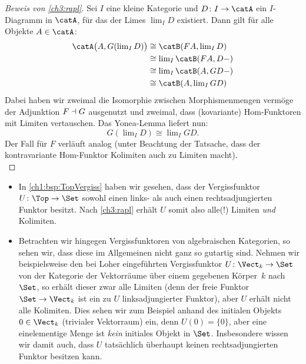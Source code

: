 \begin{proof}[Beweis von \cref{ch3:rapl}]
    Sei $I$ eine kleine Kategorie und $D\colon I\to\catA$ ein $I$-Diagramm
    in $\catA$, für das der Limes $\lim_I D$ existiert. Dann gilt für alle
    Objekte $A\in\catA$:
    \begin{align*}
        \catA\bigl(A, G(\lim\nolimits_I D)\bigr)
        &\cong \catB(FA, \lim\nolimits_I D)          \\
        &\cong \lim\nolimits_I \catB(FA, D\blank)    \\
        &\cong \lim\nolimits_I \catB(A, GD\blank)    \\
        &\cong \catB(A,\lim\nolimits_I GD)
    \end{align*}
    Dabei haben wir zweimal die Isomorphie zwischen Morphismenmengen vermöge der
    Adjunktion $F\dashv G$ ausgenutzt und zweimal, dass (kovariante) 
    Hom-Funktoren mit Limiten vertauschen. Das Yonea-Lemma liefert nun: 
    \[ G(\lim\nolimits_I D) \cong \lim\nolimits_I GD  . \]
    Der Fall für $F$ verläuft analog (unter Beachtung der Tatsache, dass der
    kontravariante Hom-Funktor Kolimiten auch zu Limiten macht).
    \\
\end{proof}

\begin{thBeispiel}\hfill
    \begin{itemize}
        \item
            In \cref{ch1:bsp:TopVergiss} haben wir gesehen, dass der Vergissfunktor
            $U\colon\Top\to\Set$ sowohl einen links- als auch einen rechtsadjungierten
            Funktor besitzt. Nach \cref{ch3:rapl} erhält $U$ somit also alle(!) Limiten
            \emph{und} Kolimiten.
            
        \item
            Betrachten wir hingegen Vergissfunktoren von algebraischen Kategorien, so
            sehen wir, dass diese im Allgemeinen nicht ganz so gutartig sind. Nehmen wir
            beispielsweise den bei Loher\cite[1.3]{talk:loher} eingeführten
            Vergissfunktor $U\colon \Vect_k\to\Set$ von der Kategorie der Vektorräume
            über einem gegebenen Körper~$k$ nach $\Set$, so erhält dieser zwar alle
            Limiten (denn der freie Funktor $\Set\to\Vect_k$ ist ein zu $U$
            linksadjungierter Funktor), aber $U$ erhält nicht alle Kolimiten. Dies sehen
            wir zum Beispiel anhand des initialen Objekts $0\in\Vect_k$ (trivialer
            Vektorraum) ein, denn $U(0) = \{0\}$, aber eine einelementige Menge ist
            \emph{kein} initiales Objekt in $\Set$. Insbesondere wissen wir damit auch,
            dass $U$ tatsächlich überhaupt keinen rechtsadjungierten Funktor
            besitzen kann. 
    \end{itemize}
\end{thBeispiel}

